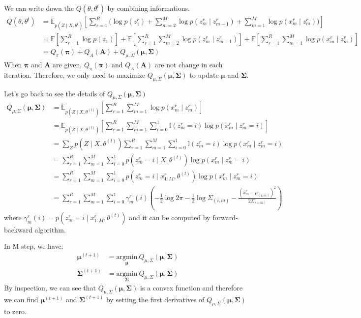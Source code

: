 \documentclass[12pt]{article}
\newenvironment{problem}[2][Problem]{\begin{trivlist}
\item[\hskip \labelsep {\bfseries #1}\hskip \labelsep {\bfseries #2.}]}{\end{trivlist}}
\begin{document}
\begin{problem}{2.6.18}
We can write down the $Q(\theta, \theta^{t})$ by combining informations.
\begin{align*}
    Q(\theta, \theta^{t}) &= 
    \mathbb{E}_{p(Z\mid X, \theta^{t})}[ \sum_{r=1}^{R} \biggl(
        \log p(z^r_1) 
        + \sum_{m=2}^{M} \log p(z^r_m \mid z^r_{m-1}) 
        + \sum_{m=1}^{M} \log p(x^r_m\mid z^r_m)\biggl)] \\
    &= \mathbb{E}[\sum_{r=1}^{R} \log p(z_1)] 
        + \mathbb{E}[\sum_{r=1}^{R} \sum_{m=2}^{M} \log p(z^r_m \mid z^r_{m-1})] 
        + \mathbb{E}[\sum_{r=1}^{R} \sum_{m=1}^{M} \log p(x^r_m\mid z^r_m)] \\
    &= Q_{\pi}(\bm{\pi}) + Q_{A}(\bm{A}) + Q_{\mu, \Sigma}(\bm{\mu}, \bm{\Sigma})
\end{align*}
When $\bm{\pi}$ and $\bm{A}$ are given, $Q_{\pi}(\bm{\pi})$ and $Q_{A}(\bm{A})$ 
are not change in each iteration. Therefore, we only need to maximize 
$Q_{\mu, \Sigma}(\bm{\mu}, \bm{\Sigma})$ to update $\bm{\mu}$ and $\bm{\Sigma}$.

Let's go back to see the details of $Q_{\mu, \Sigma}(\bm{\mu}, \bm{\Sigma})$ 
\begin{align*}
    Q_{\mu, \Sigma}(\bm{\mu}, \bm{\Sigma}) 
    &= \mathbb{E}_{p(Z\mid X, \theta^{(t)})}[
            \sum_{r=1}^{R} \sum_{m=1}^{M} \log p(x^r_m\mid z^r_m)] \\
    &= \mathbb{E}_{p(Z\mid X, \theta^{(t)})}[
                \sum_{r=1}^{R} \sum_{m=1}^{M} \sum_{i=0}^{1} \mathbb{I}(z^r_m = i)\log p(x^r_m\mid z^r_m = i)] \\
    &= \sum_{Z} p(Z\mid X, \theta^{(t)})
            \sum_{r=1}^{R} \sum_{m=1}^{M} \sum_{i=0}^{1} \mathbb{I}(z^r_m = i)\log p(x^r_m\mid z^r_m = i) \\
    &= \sum_{r=1}^{R} \sum_{m=1}^{M} \sum_{i=0}^{1} p(z^r_m = i\mid X, \theta^{(t)})\log p(x^r_m\mid z^r_m = i) \\
    &= \sum_{r=1}^{R} \sum_{m=1}^{M} \sum_{i=0}^{1} p(z^r_m = i\mid x^{r}_{1:M}, \theta^{(t)})\log p(x^r_m\mid z^r_m = i) \\
    &= \sum_{r=1}^{R} \sum_{m=1}^{M} \sum_{i=0}^{1} \gamma^{r}_{m}(i)
        (-\frac{1}{2}\log 2\pi -\frac{1}{2}\log \Sigma_{(i,m)} - \frac{(x^r_m - \mu_{(i,m)})^2}{2\Sigma_{(i,m)}})
\end{align*}
where $\gamma^{r}_{m}(i) = p(z^r_m = i\mid x^{r}_{1:M}, \theta^{(t)})$ and it can be computed
by forward-backward algorithm.

In M step, we have:
\begin{align*}
    \bm{\mu}^{(t+1)} 
        &= \underset{\bm{\mu}}{\mathrm{argmin}} ~ Q_{\mu, \Sigma}(\bm{\mu}, \bm{\Sigma})  \\
    \bm{\Sigma}^{(t+1)} 
        &= \underset{\bm{\Sigma}}{\mathrm{argmin}} ~ Q_{\mu, \Sigma}(\bm{\mu}, \bm{\Sigma}) 
\end{align*}
By inspection, we can see that $Q_{\mu, \Sigma}(\bm{\mu}, \bm{\Sigma})$ 
is a convex function and therefore
we can find $\bm{\mu}^{(t+1)}$ and $\bm{\Sigma}^{(t+1)}$ 
by setting the first derivatives of $Q_{\mu, \Sigma}(\bm{\mu}, \bm{\Sigma})$
to zero.


\end{problem}
\end{document}
